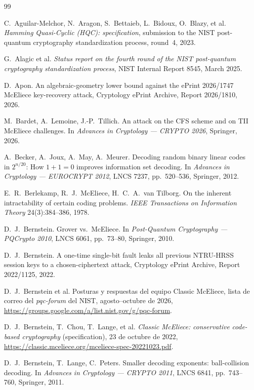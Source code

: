 \documentclass[11pt,a4paper,oneside]{report}
\begin{document}
\begin{thebibliography}{99}
\raggedright

C.~Aguilar-Melchor, N.~Aragon, S.~Bettaieb, L.~Bidoux, O.~Blazy,
et al. \emph{Hamming Quasi-Cyclic (HQC): specification}, submission
to the NIST post-quantum cryptography standardization process,
round~4, 2023.

G.~Alagic et al. \emph{Status report on the fourth round of the NIST
post-quantum cryptography standardization process}, NIST Internal
Report 8545, March 2025.

D.~Apon. An algebraic-geometry lower bound against the ePrint
2026/1747 McEliece key-recovery attack, Cryptology ePrint Archive,
Report 2026/1810, 2026.

M.~Bardet, A.~Lemoine, J.-P.~Tillich. An attack on the CFS scheme
and on TII McEliece challenges. In \emph{Advances in Cryptology ---
CRYPTO 2026}, Springer, 2026.

A.~Becker, A.~Joux, A.~May, A.~Meurer. Decoding random binary linear
codes in $2^{n/20}$: How $1+1=0$ improves information set decoding.
In \emph{Advances in Cryptology --- EUROCRYPT 2012}, LNCS 7237,
pp.~520--536, Springer, 2012.

E.~R.~Berlekamp, R.~J.~McEliece, H.~C.~A.~van Tilborg. On the
inherent intractability of certain coding problems. \emph{IEEE
Transactions on Information Theory} 24(3):384--386, 1978.

D.~J.~Bernstein. Grover vs.\ McEliece. In \emph{Post-Quantum
Cryptography --- PQCrypto 2010}, LNCS 6061, pp.~73--80, Springer,
2010.

D.~J.~Bernstein. A one-time single-bit fault leaks all previous
NTRU-HRSS session keys to a chosen-ciphertext attack, Cryptology
ePrint Archive, Report 2022/1125, 2022.

D.~J.~Bernstein et al. Posturas y respuestas del equipo Classic
McEliece, lista de correo del \emph{pqc-forum} del NIST, agosto--octubre
de 2026, \url{https://groups.google.com/a/list.nist.gov/g/pqc-forum}.

D.~J.~Bernstein, T.~Chou, T.~Lange, et al. \emph{Classic McEliece:
conservative code-based cryptography} (specification), 23 de octubre
de 2022, \url{https://classic.mceliece.org/mceliece-spec-20221023.pdf}.

D.~J.~Bernstein, T.~Lange, C.~Peters. Smaller decoding exponents:
ball-collision decoding. In \emph{Advances in Cryptology ---
CRYPTO 2011}, LNCS 6841, pp.~743--760, Springer, 2011.


\end{thebibliography}
\end{document}

